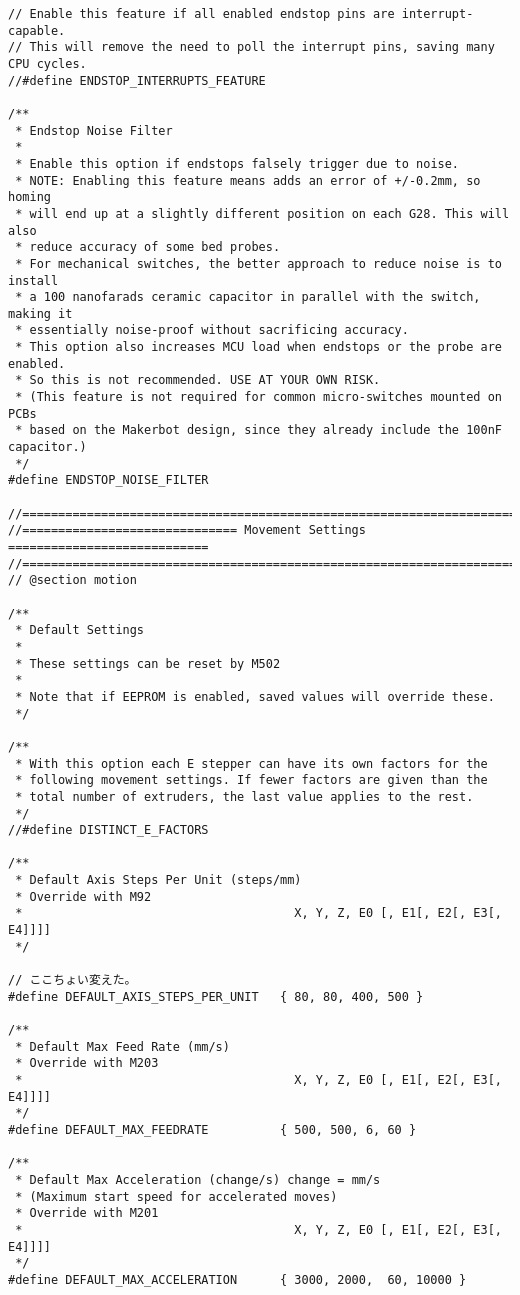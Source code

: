 \begin{lstlisting}
// Enable this feature if all enabled endstop pins are interrupt-capable.
// This will remove the need to poll the interrupt pins, saving many CPU cycles.
//#define ENDSTOP_INTERRUPTS_FEATURE

/**
 * Endstop Noise Filter
 *
 * Enable this option if endstops falsely trigger due to noise.
 * NOTE: Enabling this feature means adds an error of +/-0.2mm, so homing
 * will end up at a slightly different position on each G28. This will also
 * reduce accuracy of some bed probes.
 * For mechanical switches, the better approach to reduce noise is to install
 * a 100 nanofarads ceramic capacitor in parallel with the switch, making it
 * essentially noise-proof without sacrificing accuracy.
 * This option also increases MCU load when endstops or the probe are enabled.
 * So this is not recommended. USE AT YOUR OWN RISK.
 * (This feature is not required for common micro-switches mounted on PCBs
 * based on the Makerbot design, since they already include the 100nF capacitor.)
 */
#define ENDSTOP_NOISE_FILTER

//=============================================================================
//============================== Movement Settings ============================
//=============================================================================
// @section motion

/**
 * Default Settings
 *
 * These settings can be reset by M502
 *
 * Note that if EEPROM is enabled, saved values will override these.
 */

/**
 * With this option each E stepper can have its own factors for the
 * following movement settings. If fewer factors are given than the
 * total number of extruders, the last value applies to the rest.
 */
//#define DISTINCT_E_FACTORS

/**
 * Default Axis Steps Per Unit (steps/mm)
 * Override with M92
 *                                      X, Y, Z, E0 [, E1[, E2[, E3[, E4]]]]
 */

// ここちょい変えた。
#define DEFAULT_AXIS_STEPS_PER_UNIT   { 80, 80, 400, 500 }

/**
 * Default Max Feed Rate (mm/s)
 * Override with M203
 *                                      X, Y, Z, E0 [, E1[, E2[, E3[, E4]]]]
 */
#define DEFAULT_MAX_FEEDRATE          { 500, 500, 6, 60 }

/**
 * Default Max Acceleration (change/s) change = mm/s
 * (Maximum start speed for accelerated moves)
 * Override with M201
 *                                      X, Y, Z, E0 [, E1[, E2[, E3[, E4]]]]
 */
#define DEFAULT_MAX_ACCELERATION      { 3000, 2000,  60, 10000 }


\end{lstlisting}
